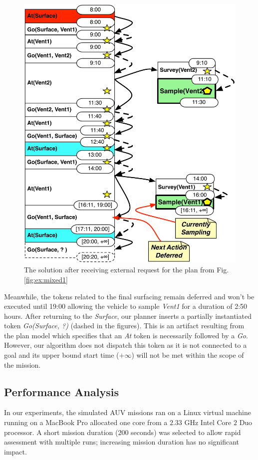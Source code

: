 \begin{figure}[t]
  \centering
  \includegraphics[width=0.8\columnwidth]{figs/example_MixedUpdate}
  \vskip-3mm
  \caption{\small The solution after receiving external request for
    the plan from Fig. \ref{fig:ex:mixed1}}
  \label{fig:ex:mixed2}
  \vskip-5mm
\end{figure}

Meanwhile, the tokens related to the final surfacing remain deferred
and won't be executed until 19:00 allowing the vehicle to sample {\em
  Vent1} for a duration of 2:50 hours.  After returning to the {\em
  Surface}, our planner inserts a partially instantiated token {\em
  Go(Surface, ?)} (dashed in the figures).  This is an artifact
resulting from the plan model which specifies that an {\em At} token
is necessarily followed by a {\em Go}.  However, our algorithm does
not dispatch this token as it is not connected to a goal and its upper
bound start time ($+\infty$) will not be met within the scope of the
mission.

\subsection{Performance Analysis}

In our experiments, the simulated AUV missions ran on a Linux virtual
machine running on a MacBook Pro allocated one core from a $2.33$ GHz
Intel Core $2$ Duo processor.  A short mission duration ($200$
seconds) was selected to allow rapid assessment with multiple runs;
increasing mission duration has no significant impact.

